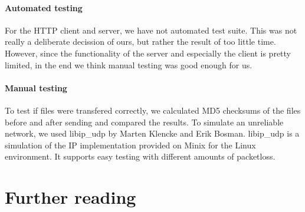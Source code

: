 \documentclass[11pt]{article}
\begin{document}
\paragraph{Automated testing}

For the HTTP client and server, we have not automated test suite. This was not
really a deliberate decission of ours, but rather the result of too little
time. However, since the functionality of the server and especially the client
is pretty limited, in the end we think manual testing was good enough for us.

\paragraph{Manual testing}

To test if files were transfered correctly, we calculated MD5 checksums of the
files before and after sending and compared the results. To simulate an
unreliable network, we used libip\_udp by Marten Klencke and Erik
Bosman. libip\_udp is a simulation of the IP implementation provided on Minix
for the Linux environment. It supports easy testing with different amounts of
packetloss.


\section{Further reading}
\end{document}
